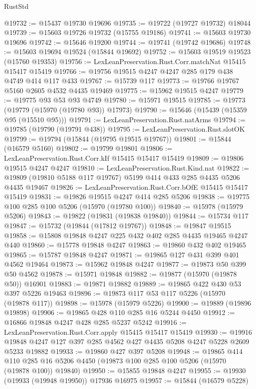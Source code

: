 \begin{lexlean}{RustStd}
\begin{coremodule}
@19732 := @15437 @19730 @19696
@19735 := @19722 (@19727 @19732) @18044
@19739 := @15603 @19726 @19732 (@15755 @19186)
@19741 := @15603 @19730 @19696
@19742 := @15646 @19200
@19744 := @19741 (@19742 @19686)
@19748 := @15603 @19694 @19524 (@15844 @19692)
@19752 := @15603 @19519 @19523 (@15760 @19353)
@19756 := LexLeanPreservation.Rust.Corr.matchNat @15415 @15417 @15419
@19766 := @19756 @19515 @4247 @4247 @285 @179 @438 @4749 @414 @117 @433
@19767 := @15739 @117
@19773 := @19766 @19767 @5160 @2605 @4532 @4435 @19469
@19775 := @15962 @19515 @4247
@19779 := @19775 @93 @53 @93 @4749
@19780 := @15971 @19515
@19785 := @19773 (@19779 (@15970 (@19780 @93)) @17973)
@19790 := @15646 (@15439 (@15359 @95 (@15510 @95)))
@19791 := LexLeanPreservation.Rust.natArms
@19794 := @19785 (@19790 (@19791 @438))
@19795 := LexLeanPreservation.Rust.slotOK
@19799 := @19794 (@15844 (@19795 @19515 @19767))
@19801 := @15844 (@16579 @5160)
@19802 := @19799 @19801
@19806 := LexLeanPreservation.Rust.Corr.kIf @15415 @15417 @15419
@19809 := @19806 @19515 @4247 @4247
@19810 := LexLeanPreservation.Rust.Kind.nat
@19822 := @19809 (@19810 @5188 @117 @19767) @5199 @414 @433 @285 @4435 @5206 @4435 @19467
@19826 := LexLeanPreservation.Rust.Corr.bOfE @15415 @15417 @15419
@19831 := @19826 @19515 @4247 @414 @285 @5206
@19838 := @19775 @100 @285 @100 @5206 (@15970 (@19780 @100))
@19840 := @15978 (@15979 @5206)
@19843 := @19822 (@19831 (@19838 @19840))
@19844 := @15734 @117
@19847 := @15732 (@19844 (@17812 @19767))
@19848 := @19847 @19515
@19858 := @15808 @19848 @4247 @225 @432 @402 @285 @4435 @19465 @4247 @440
@19860 := @15778 @19848 @4247
@19863 := @19860 @432 @402 @19465
@19865 := @15787 @19848 @4247
@19871 := @19865 @127 @431 @399 @401 @4562 @19464
@19873 := @15962 @19848 @4247
@19877 := @19873 @50 @399 @50 @4562
@19878 := @15971 @19848
@19882 := @19877 (@15970 (@19878 @50)) @16901
@19883 := @19871 @19882
@19889 := @19865 @422 @430 @53 @397 @5226 @19463
@19896 := @19873 @117 @53 @117 @5226 (@15970 (@19878 @117))
@19898 := @15978 (@15979 @5226)
@19900 := @19889 (@19896 @19898)
@19906 := @19865 @428 @110 @285 @16 @5244 @4450
@19912 := @16866 @19848 @4247 @428 @285 @5237 @5242
@19916 := LexLeanPreservation.Rust.Corr.apply @15415 @15417 @15419
@19930 := @19916 @19848 @4247 @127 @397 @285 @4562 @427 @4435 @5208 @4247 @5228 @2609 @5233 @19882
@19933 := @19860 @427 @397 @5208
@19948 := @19865
    @414
    @110
    @285
    @16
    @5206
    @4450
    (@19873 @100 @285 @100 @5206 (@15970 (@19878 @100)) @19840)
@19950 := @15855 @19848 @4247
@19955 := @19930 (@19933 (@19948 @19950)) @17936 @16975
@19957 := @15844 (@16579 @5228)

\end{coremodule}
\end{lexlean}

